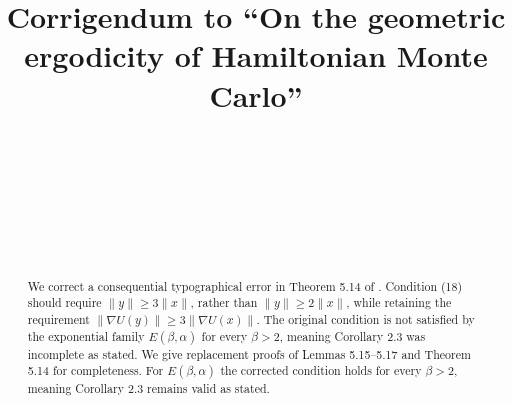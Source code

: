 


\startlocaldefs
\theoremstyle{plain}
\newtheorem*{lemma515}{Lemma 5.15}
\newtheorem*{lemma516}{Lemma 5.16}
\newtheorem*{lemma517}{Lemma 5.17}
\newtheorem*{theorem514}{Theorem 5.14}
\newtheorem*{corollary23}{Corollary 2.3(ii), $\beta>2$ case}
\endlocaldefs

%

\begin{frontmatter}

\title{Corrigendum to ``On the geometric ergodicity of Hamiltonian Monte Carlo''}

\begin{aug}
\author[A]{~}
\author[B]{~}
\author[C]{~}
\author[D]{~}

\address[A]{Department of Statistical Science, University College London,
Gower Street, London WC1E 6BT, United Kingdom}
\address[B]{Symplectomorphic LLC, New York, NY, USA}
\address[C]{NVIDIA Corporation, 2788 San Tomas Expressway,
Santa Clara, CA 95051, USA}
\address[D]{Department of Engineering, University of Cambridge, Trumpington Street, Cambridge CB2 1PZ, United Kingdom}


\end{aug}

\begin{abstract}
We correct a consequential typographical error in Theorem 5.14 of \cite{Livingstone2019}. Condition (18) should require
$\|y\|\geq 3\|x\|$, rather than $\|y\|\geq 2\|x\|$, while retaining the
requirement $\|\nabla U(y)\|\geq 3\|\nabla U(x)\|$. The original condition is
not satisfied by the exponential family $E(\beta,\alpha)$ for every
$\beta>2$, meaning Corollary 2.3 was incomplete as stated. We give replacement proofs of Lemmas 5.15--5.17 and
Theorem 5.14 for completeness.  For
$E(\beta,\alpha)$ the corrected condition holds for every $\beta>2$, meaning Corollary 2.3 remains valid as stated.
\end{abstract}

\begin{keyword}
\end{keyword}

\end{frontmatter}

